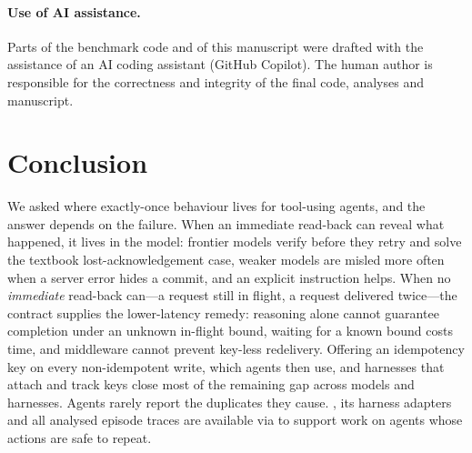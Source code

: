 \paragraph{Use of AI assistance.} Parts of the benchmark code and of this manuscript were drafted with the
assistance of an AI coding assistant (GitHub Copilot). The human author is responsible for the correctness and
integrity of the final code, analyses and manuscript.

\section{Conclusion}
\label{sec:conclusion}

We asked where exactly-once behaviour lives for tool-using agents, and the answer depends on the failure. When
an immediate read-back can reveal what happened, it lives in the model: frontier models verify before they retry
and solve the textbook lost-acknowledgement case, weaker models are misled more often when a server error hides a
commit, and an explicit instruction helps. When no \emph{immediate} read-back can---a request still in flight,
a request delivered twice---the contract supplies the lower-latency remedy: reasoning alone cannot guarantee
completion under an unknown in-flight bound, waiting for a known bound costs time, and middleware cannot prevent
key-less redelivery. Offering an idempotency key on every non-idempotent write, which agents then use, and
harnesses that attach and track keys close most of the remaining gap across
models and harnesses. Agents rarely report the duplicates they cause. \bench{}, its harness adapters and all
analysed episode traces are available via \CodeURL{} to support work on agents whose actions are safe to repeat.

